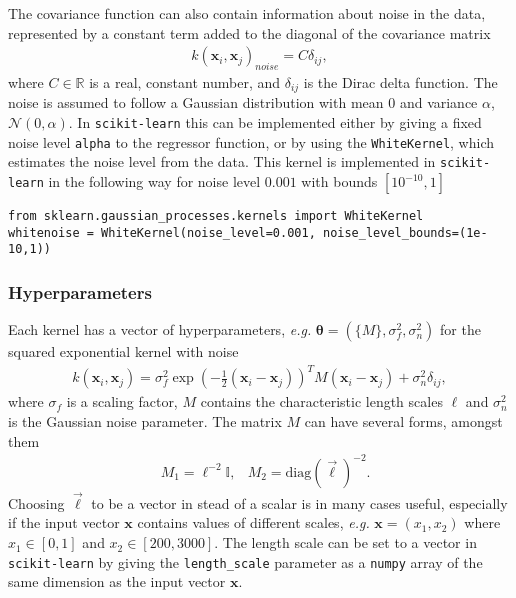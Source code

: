 \documentclass[twoside,english]{uiofysmaster}
\begin{document}
The covariance function can also contain information about noise in the data, represented by a constant term added to the diagonal of the covariance matrix
\begin{align}
k(\textbf{x}_i, \textbf{x}_j)_{noise} = C \delta_{ij},
\end{align}
where $C \in \mathbb{R}$ is a real, constant number, and $\delta_{ij}$ is the Dirac delta function. The noise is assumed to follow a Gaussian distribution with mean $0$ and variance $\alpha$, $\mathcal{N}(0, \alpha)$. In \verb|scikit-learn| this can be implemented either by giving a fixed noise level \verb|alpha| to the regressor function, or by using the \verb|WhiteKernel|, which estimates the noise level from the data. This kernel is implemented in \verb|scikit-learn| in the following way for noise level $0.001$ with bounds $[10^{-10}, 1]$
\begin{lstlisting}
from sklearn.gaussian_processes.kernels import WhiteKernel
whitenoise = WhiteKernel(noise_level=0.001, noise_level_bounds=(1e-10,1))
\end{lstlisting}

\subsubsection{Hyperparameters}

Each kernel has a vector of hyperparameters, \textit{e.g.} $\boldsymbol{\theta} = (\{M\}, \sigma^2_f, \sigma_n^2)$ for the squared exponential kernel with noise
\begin{align}
k(\textbf{x}_i, \textbf{x}_j) = \sigma_f^2 \exp (- \frac{1}{2} (\textbf{x}_i - \textbf{x}_j))^T M (\textbf{x}_i - \textbf{x}_j) + \sigma_n^2 \delta_{ij},
\end{align}
where $\sigma_f$ is a scaling factor, $M$ contains the characteristic length scales $\ell$ and $\sigma_n^2$ is the Gaussian noise parameter. The matrix $M$ can have several forms, amongst them
\begin{align}
&M_1 = \ell^{-2} \mathbb{I} , &M_2 = \text{diag}(\vec{\ell})^{-2}.
\end{align}
Choosing $\vec{\ell}$ to be a vector in stead of a scalar is in many cases useful, especially if the input vector $\textbf{x}$ contains values of different scales, \textit{e.g.} $\textbf{x} = (x_1, x_2)$ where $x_1 \in [0, 1]$ and $x_2 \in [200, 3000]$. The length scale can be set to a vector in \verb|scikit-learn| by giving the \verb|length_scale| parameter as a \verb|numpy| array of the same dimension as the input vector $\textbf{x}$.
\end{document}
